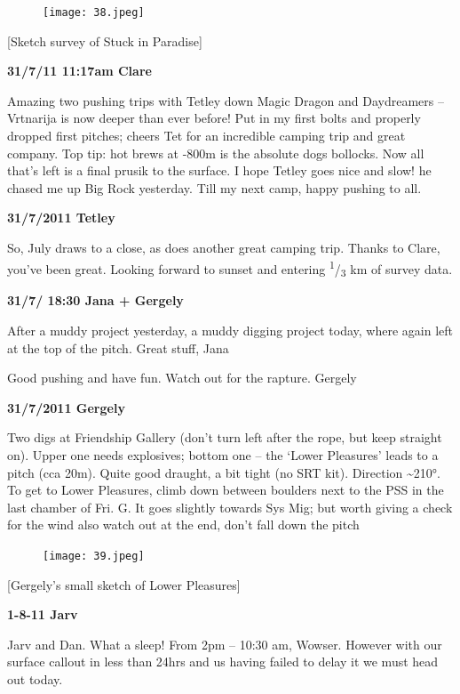 \begin{figure}[htbp]
\centering
\texttt{[image: 38.jpeg]}
\caption{}
\end{figure}

{[}Sketch survey of Stuck in Paradise{]}

\textbf{31/7/11 11:17am Clare}

Amazing two pushing trips with Tetley down Magic Dragon and Daydreamers
-- Vrtnarija is now deeper than ever before! Put in my first bolts and
properly dropped first pitches; cheers Tet for an incredible camping
trip and great company. Top tip: hot brews at -800m is the absolute dogs
bollocks. Now all that's left is a final prusik to the surface. I hope
Tetley goes nice and slow! he chased me up Big Rock yesterday. Till my
next camp, happy pushing to all.

\textbf{31/7/2011 Tetley}

So, July draws to a close, as does another great camping trip. Thanks to
Clare, you've been great. Looking forward to sunset and entering
\textsuperscript{1}/\textsubscript{3} km of survey data.

\textbf{31/7/ 18:30 Jana + Gergely}

After a muddy project yesterday, a muddy digging project today, where
again left at the top of the pitch. Great stuff, Jana

Good pushing and have fun. Watch out for the rapture. Gergely

\textbf{31/7/2011 Gergely}

Two digs at Friendship Gallery (don't turn left after the rope, but keep
straight on). Upper one needs explosives; bottom one -- the `Lower
Pleasures' leads to a pitch (cca 20m). Quite good draught, a bit tight
(no SRT kit). Direction \textasciitilde{}210°. To get to Lower
Pleasures, climb down between boulders next to the PSS in the last
chamber of Fri. G. It goes slightly towards Sys Mig; but worth giving a
check for the wind also watch out at the end, don't fall down the pitch

\begin{figure}[htbp]
\centering
\texttt{[image: 39.jpeg]}
\caption{}
\end{figure}

{[}Gergely's small sketch of Lower Pleasures{]}

\textbf{1-8-11 Jarv}

Jarv and Dan. What a sleep! From 2pm -- 10:30 am, Wowser. However with
our surface callout in less than 24hrs and us having failed to delay it
we must head out today.

